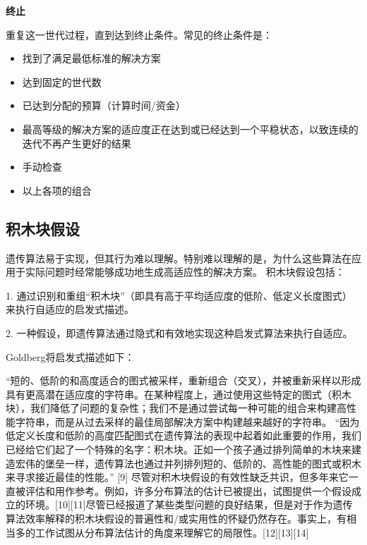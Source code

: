\textbf{终止}

重复这一世代过程，直到达到终止条件。常见的终止条件是：
\begin{itemize}
\item 找到了满足最低标准的解决方案
\item 达到固定的世代数
\item 已达到分配的预算（计算时间/资金）
\item 最高等级的解决方案的适应度正在达到或已经达到一个平稳状态，以致连续的迭代不再产生更好的结果
\item 手动检查
\item 以上各项的组合
\end{itemize}

\subsection{积木块假设}
遗传算法易于实现，但其行为难以理解。特别难以理解的是，为什么这些算法在应用于实际问题时经常能够成功地生成高适应性的解决方案。 积木块假设包括：

1.    通过识别和重组“积木块”（即具有高于平均适应度的低阶、低定义长度图式）来执行自适应的启发式描述。

2.    一种假设，即遗传算法通过隐式和有效地实现这种启发式算法来执行自适应。

Goldberg将启发式描述如下：

“短的、低阶的和高度适合的图式被采样，重新组合（交叉），并被重新采样以形成具有更高潜在适应度的字符串。在某种程度上，通过使用这些特定的图式（积木块），我们降低了问题的复杂性；我们不是通过尝试每一种可能的组合来构建高性能字符串，而是从过去采样的最佳局部解决方案中构建越来越好的字符串。 “因为低定义长度和低阶的高度匹配图式在遗传算法的表现中起着如此重要的作用，我们已经给它们起了一个特殊的名字：积木块。正如一个孩子通过排列简单的木块来建造宏伟的堡垒一样，遗传算法也通过并列排列短的、低阶的、高性能的图式或积木来寻求接近最佳的性能。” [9]
尽管对积木块假设的有效性缺乏共识，但多年来它一直被评估和用作参考。例如，许多分布算法的估计已被提出，试图提供一个假设成立的环境。[10][11]尽管已经报道了某些类型问题的良好结果，但是对于作为遗传算法效率解释的积木块假设的普遍性和/或实用性的怀疑仍然存在。事实上，有相当多的工作试图从分布算法估计的角度来理解它的局限性。[12][13][14]

